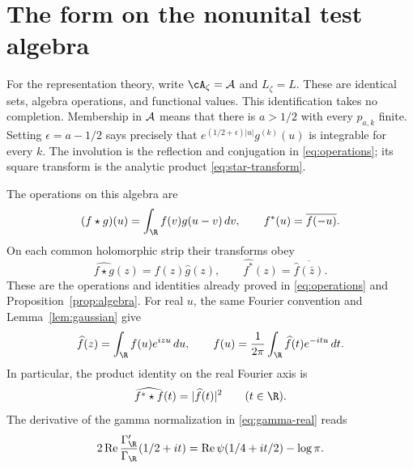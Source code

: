 \section{The form on the nonunital test algebra}
\label{sec:native-form}

For the representation theory, write
$\cA_\zeta=\A$ and $L_\zeta=L$.
These are identical sets, algebra operations, and functional values.
This identification takes no completion.  Membership in $\mathcal A$ means that there is
$a>1/2$ with every $p_{a,k}$ finite.  Setting $\epsilon=a-1/2$ says precisely
that $e^{(1/2+\epsilon)|u|}g^{(k)}(u)$ is integrable for every $k$.
The involution is the reflection and conjugation in
\eqref{eq:operations}; its square transform is the analytic product
\eqref{eq:star-transform}.

The operations on this algebra are
\begin{equation}
 (f\star g)(u)=\int_{\R}f(v)g(u-v)\,dv,
 \qquad f^*(u)=\overline{f(-u)}.
 \label{eq:conv}
\end{equation}
On each common holomorphic strip their transforms obey
\begin{equation}
 \widehat{f\star g}(z)=\widehat f(z)\widehat g(z),
 \qquad\widehat{f^*}(z)=\overline{\widehat f(\bar z)}.
 \label{eq:transform}
\end{equation}
These are the operations and identities already proved in
\eqref{eq:operations} and Proposition~\ref{prop:algebra}.
For real $u$, the same Fourier convention and Lemma~\ref{lem:gaussian} give
\begin{equation}
 \widehat f(z)=\int_{\R}f(u)e^{izu}\,du,
 \qquad f(u)=\frac1{2\pi}\int_{\R}\widehat f(t)e^{-itu}\,dt.
 \label{eq:fourier}
\end{equation}
In particular, the product identity on the real Fourier axis is
\begin{equation}
 \widehat{f^*\star f}(t)=|\widehat f(t)|^2\qquad(t\in\R).
 \label{eq:square-transform}
\end{equation}
The derivative of the gamma normalization in \eqref{eq:gamma-real} reads
\begin{equation}
 2\operatorname{Re}\frac{\Gamma_{\R}'}{\Gamma_{\R}}(1/2+it)
 =\operatorname{Re}\psi(1/4+it/2)-\log\pi.
 \label{eq:gamma-normalization}
\end{equation}


